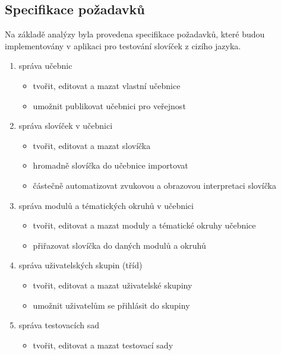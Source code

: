 \documentclass[a4paper,11pt,titlepage,fleqn]{article}
\begin{document}
    \subsection{Specifikace požadavků}
        Na základě analýzy byla provedena specifikace požadavků, které budou implementovány v aplikaci pro testování slovíček z cizího jazyka.

        \begin{enumerate}
            \item správa učebnic
                \begin{itemize}
                    \item tvořit, editovat a mazat vlastní učebnice
                    \item umožnit publikovat učebnici pro veřejnost
                \end{itemize} 
            \item správa slovíček v učebnici
                \begin{itemize}
                    \item tvořit, editovat a mazat slovíčka
                    \item hromadně slovíčka do učebnice importovat
                    \item částečně automatizovat zvukovou a obrazovou interpretaci slovíčka
                \end{itemize} 
            \item správa modulů a tématických okruhů v učebnici
                \begin{itemize}
                    \item tvořit, editovat a mazat moduly a tématické okruhy učebnice
                    \item přiřazovat slovíčka do daných modulů a okruhů
                \end{itemize}
            \item správa uživatelských skupin (tříd)
                \begin{itemize}
                    \item tvořit, editovat a mazat uživatelské skupiny
                    \item umožnit uživatelům se přihlásit do skupiny
                \end{itemize}
            \item správa testovacích sad
                \begin{itemize}
                    \item tvořit, editovat a mazat testovací sady

\end{itemize}
\end{enumerate}
\end{document}

